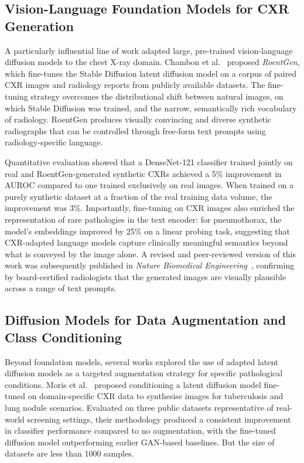 \subsection{Vision-Language Foundation Models for CXR Generation}

A particularly influential line of work adapted large, pre-trained vision-language diffusion
models to the chest X-ray domain. Chambon et al.~\cite{Chambon2022RoentGen} proposed
\emph{RoentGen}, which fine-tunes the Stable Diffusion latent diffusion model on a corpus of
paired CXR images and radiology reports from publicly available datasets. The fine-tuning
strategy overcomes the distributional shift between natural images, on which Stable Diffusion
was trained, and the narrow, semantically rich vocabulary of radiology. RoentGen produces
visually convincing and diverse synthetic radiographs that can be controlled through
free-form text prompts using radiology-specific language.

Quantitative evaluation showed that a DenseNet-121 classifier trained jointly on real and
RoentGen-generated synthetic CXRs achieved a 5\% improvement in AUROC compared to one trained
exclusively on real images. When trained on a purely synthetic dataset at a fraction of the
real training data volume, the improvement was 3\%. Importantly, fine-tuning on CXR images
also enriched the representation of rare pathologies in the text encoder: for pneumothorax,
the model's embeddings improved by 25\% on a linear probing task, suggesting that CXR-adapted
language models capture clinically meaningful semantics beyond what is conveyed by the image
alone. A revised and peer-reviewed version of this work was subsequently published in
\emph{Nature Biomedical Engineering}~\cite{Bluethgen2024}, confirming by board-certified
radiologists that the generated images are visually plausible across a range of text prompts.

\subsection{Diffusion Models for Data Augmentation and Class Conditioning}

Beyond foundation models, several works explored the use of adapted latent diffusion models
as a targeted augmentation strategy for specific pathological conditions. Moris
et al.~\cite{Moris2024} proposed conditioning a latent diffusion model fine-tuned on domain-specific
CXR data to synthesise images for tuberculosis and lung nodule scenarios. Evaluated on three
public datasets representative of real-world screening settings, their methodology produced a
consistent improvement in classifier performance compared to no augmentation, with the
fine-tuned diffusion model outperforming earlier GAN-based baselines. But the size of datasets are 
less than 1000 samples. 

